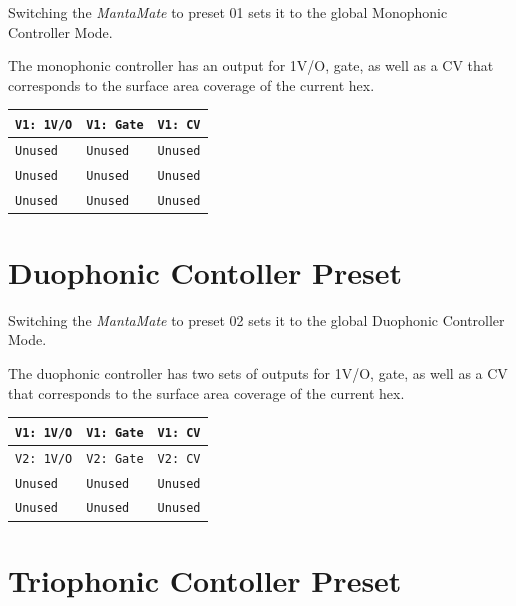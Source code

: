   Switching the \emph{MantaMate} to preset 01 sets it to the global
  Monophonic Controller Mode.

  The monophonic controller has an output for 1V/O, gate, as well
  as a CV that corresponds to the surface area coverage of the current
  hex.

  \begin{center}
  \begin{tabular}{ | m{1.5cm} | m{1.5cm}| m{1.5cm} | }
    \hline
    \texttt{V1: 1V/O} & \texttt{V1: Gate} & \texttt{V1: CV} \\
    \hline
    \texttt{Unused} & \texttt{Unused} & \texttt{Unused} \\
    \hline
    \texttt{Unused} & \texttt{Unused} & \texttt{Unused} \\
    \hline
    \texttt{Unused} & \texttt{Unused} & \texttt{Unused} \\
    \hline
  \end{tabular}
  \end{center}


\section{Duophonic Contoller Preset}

  Switching the \emph{MantaMate} to preset 02 sets it to the global
  Duophonic Controller Mode.

  The duophonic controller has two sets of outputs for 1V/O, gate, as well
  as a CV that corresponds to the surface area coverage of the current
  hex.

  \begin{center}
  \begin{tabular}{ | m{1.5cm} | m{1.5cm}| m{1.5cm} | }
    \hline
    \texttt{V1: 1V/O} & \texttt{V1: Gate} & \texttt{V1: CV} \\
    \hline
    \texttt{V2: 1V/O} & \texttt{V2: Gate} & \texttt{V2: CV} \\
    \hline
    \texttt{Unused} & \texttt{Unused} & \texttt{Unused} \\
    \hline
    \texttt{Unused} & \texttt{Unused} & \texttt{Unused} \\
    \hline
  \end{tabular}
  \end{center}


\section{Triophonic Contoller Preset}

